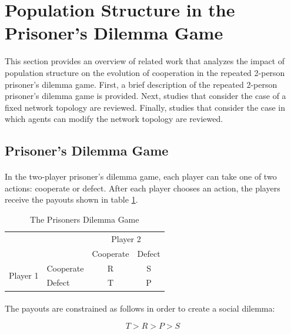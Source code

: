 \documentclass{article}
\begin{document}
    \section{Population Structure in the Prisoner's Dilemma Game}
    This section provides an overview of related work that analyzes the impact of population structure on the evolution of cooperation in the repeated 2-person prisoner's dilemma game.  First, a brief description of the repeated 2-person prisoner's dilemma game is provided.  Next, studies that consider the case of a fixed network topology are reviewed.  Finally, studies that consider the case in which agents can modify the network topology are reviewed.
    
    \pagebreak
    \subsection{Prisoner's Dilemma Game}
    \paragraph{}In the two-player prisoner's dilemma game, each player can take one of two actions: cooperate or defect.  After each player chooses an action, the players receive the payouts shown in table \ref{table:pdpayouts}.

    \begin{table}[h]
      \begin{center}
      \begin{tabular}{llcc}
    	\toprule
		&	&	\multicolumn{2}{c}{Player 2} \\ \cmidrule{3-4}
		&   & 	Cooperate & Defect  \\ \midrule
    	\multirow{2}{*}{Player 1}
    		& Cooperate   & R  & S  \\
    		& Defect  	  & T  & P \\ \bottomrule
      \end{tabular}
      \caption{The Prisoners Dilemma Game}
      \label{table:pdpayouts}
	  \end{center}
    \end{table}

    \paragraph{}The payouts are constrained as follows in order to create a social dilemma:

    \begin{equation}
    	T > R > P > S
    \end{equation}
    
\end{document}
